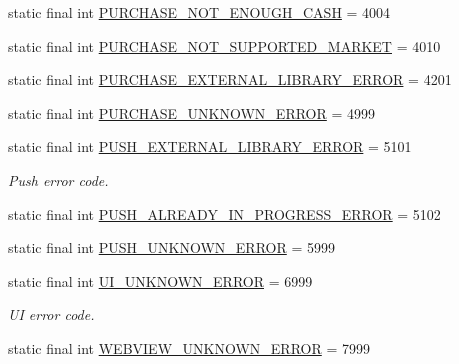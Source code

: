 \begin{DoxyCompactItemize}
\item 
static final int \hyperlink{classcom_1_1toast_1_1android_1_1gamebase_1_1base_1_1_gamebase_error_a9c30750707323692db2c8344b96a165c}{P\+U\+R\+C\+H\+A\+S\+E\+\_\+\+N\+O\+T\+\_\+\+E\+N\+O\+U\+G\+H\+\_\+\+C\+A\+SH} = 4004
\item 
static final int \hyperlink{classcom_1_1toast_1_1android_1_1gamebase_1_1base_1_1_gamebase_error_a55d68288ba8d0c83950b50cec0f80a84}{P\+U\+R\+C\+H\+A\+S\+E\+\_\+\+N\+O\+T\+\_\+\+S\+U\+P\+P\+O\+R\+T\+E\+D\+\_\+\+M\+A\+R\+K\+ET} = 4010
\item 
static final int \hyperlink{classcom_1_1toast_1_1android_1_1gamebase_1_1base_1_1_gamebase_error_a5e0e68e0ccd1e16526599293c38122e5}{P\+U\+R\+C\+H\+A\+S\+E\+\_\+\+E\+X\+T\+E\+R\+N\+A\+L\+\_\+\+L\+I\+B\+R\+A\+R\+Y\+\_\+\+E\+R\+R\+OR} = 4201
\item 
static final int \hyperlink{classcom_1_1toast_1_1android_1_1gamebase_1_1base_1_1_gamebase_error_a4954d9c824504e5ecb7a660611a06455}{P\+U\+R\+C\+H\+A\+S\+E\+\_\+\+U\+N\+K\+N\+O\+W\+N\+\_\+\+E\+R\+R\+OR} = 4999
\item 
static final int \hyperlink{classcom_1_1toast_1_1android_1_1gamebase_1_1base_1_1_gamebase_error_a32799f53809522f48199d87b1742424c}{P\+U\+S\+H\+\_\+\+E\+X\+T\+E\+R\+N\+A\+L\+\_\+\+L\+I\+B\+R\+A\+R\+Y\+\_\+\+E\+R\+R\+OR} = 5101
\begin{DoxyCompactList}\small\item\em Push error code. \end{DoxyCompactList}\item 
static final int \hyperlink{classcom_1_1toast_1_1android_1_1gamebase_1_1base_1_1_gamebase_error_a07f43cdd647b44c79a5495de908d15b9}{P\+U\+S\+H\+\_\+\+A\+L\+R\+E\+A\+D\+Y\+\_\+\+I\+N\+\_\+\+P\+R\+O\+G\+R\+E\+S\+S\+\_\+\+E\+R\+R\+OR} = 5102
\item 
static final int \hyperlink{classcom_1_1toast_1_1android_1_1gamebase_1_1base_1_1_gamebase_error_a823a5ca14fe66e59c63f710e2d67f4e8}{P\+U\+S\+H\+\_\+\+U\+N\+K\+N\+O\+W\+N\+\_\+\+E\+R\+R\+OR} = 5999
\item 
static final int \hyperlink{classcom_1_1toast_1_1android_1_1gamebase_1_1base_1_1_gamebase_error_a4c0ed79f0ab3029b200531931583be9f}{U\+I\+\_\+\+U\+N\+K\+N\+O\+W\+N\+\_\+\+E\+R\+R\+OR} = 6999
\begin{DoxyCompactList}\small\item\em UI error code. \end{DoxyCompactList}\item 
static final int \hyperlink{classcom_1_1toast_1_1android_1_1gamebase_1_1base_1_1_gamebase_error_a5d107027e581550a08babbfd2440da86}{W\+E\+B\+V\+I\+E\+W\+\_\+\+U\+N\+K\+N\+O\+W\+N\+\_\+\+E\+R\+R\+OR} = 7999

\end{DoxyCompactItemize}
